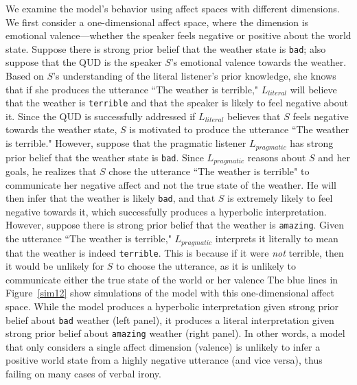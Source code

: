 \documentclass[10pt,letterpaper]{article}
\begin{document}
We examine the model's behavior using affect spaces with different dimensions.  
We first consider a one-dimensional affect space, where the dimension is emotional valence---whether the speaker feels negative or positive about the world state.  
%
%
Suppose there is strong prior belief that the weather state is \texttt{bad}; also suppose that the QUD is the speaker $S$'s emotional valence towards the weather. Based on $S$'s understanding of the literal listener's prior knowledge, she knows that if she produces the utterance ``The weather is terrible," $L_{literal}$ will believe that the weather is \texttt{terrible} and that the speaker is likely to feel negative about it. Since the QUD is successfully addressed if $L_{literal}$ believes that $S$ feels negative towards the weather state, $S$ is motivated to produce the utterance ``The weather is terrible." However, suppose that the pragmatic listener $L_{pragmatic}$ has strong prior belief that the weather state is \texttt{bad}. Since $L_{pragmatic}$ reasons about $S$ and her goals, he realizes that $S$ chose the utterance ``The weather is terrible" to communicate her negative affect and not the true state of the weather. He will then infer that the weather is likely \texttt{bad}, and that $S$ is extremely likely to feel negative towards it, which successfully produces a hyperbolic interpretation. However, suppose there is strong prior belief that the weather is \texttt{amazing}. Given the utterance ``The weather is terrible," $L_{pragmatic}$ interprets it literally to mean that the weather is indeed \texttt{terrible}. This is because if it were \emph{not} terrible, then it would be unlikely for $S$ to choose the utterance, as it is unlikely to communicate either the true state of the world or her valence The blue lines in Figure~\ref{sim12} show simulations of the model with this one-dimensional affect space. While the model produces a hyperbolic interpretation given strong prior belief about \texttt{bad} weather (left panel), it produces a literal interpretation given strong prior belief about \texttt{amazing} weather (right panel). In other words, a model that only considers a single affect dimension (valence) is unlikely to infer a positive world state from a highly negative utterance (and vice versa), thus failing on many cases of verbal irony. 
\end{document}
